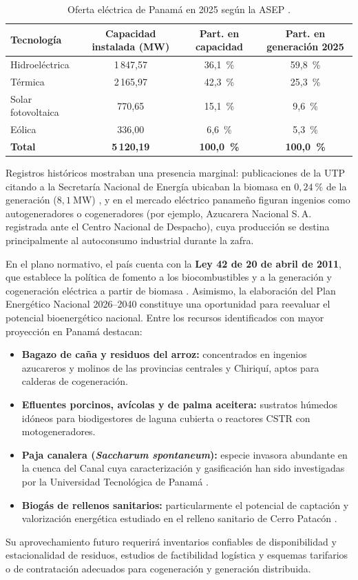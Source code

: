 \begin{table}[htbp]
\centering
\caption{Oferta eléctrica de Panamá en 2025 según la ASEP \cite{asep2025oferta}.}
\label{tab:asep_panama}
\begin{tabular}{@{}lccc@{}}
\toprule
\textbf{Tecnología} & \textbf{Capacidad instalada (MW)} & \textbf{Part. en capacidad} & \textbf{Part. en generación 2025} \\
\midrule
Hidroeléctrica & 1\,847,57 & 36,1~\% & 59,8~\% \\
Térmica & 2\,165,97 & 42,3~\% & 25,3~\% \\
Solar fotovoltaica & 770,65 & 15,1~\% & 9,6~\% \\
Eólica & 336,00 & 6,6~\% & 5,3~\% \\
\midrule
\textbf{Total} & \textbf{5\,120,19} & \textbf{100,0~\%} & \textbf{100,0~\%} \\
\bottomrule
\end{tabular}
\end{table}

Registros históricos mostraban una presencia marginal: publicaciones de la UTP citando a la Secretaría Nacional de Energía ubicaban la biomasa en $0{,}24~\%$ de la generación ($8{,}1~\text{MW}$) \cite{utp_pajacanalera}, y en el mercado eléctrico panameño figuran ingenios como autogeneradores o cogeneradores (por ejemplo, Azucarera Nacional S.\,A. registrada ante el Centro Nacional de Despacho), cuya producción se destina principalmente al autoconsumo industrial durante la zafra.

En el plano normativo, el país cuenta con la \textbf{Ley 42 de 20 de abril de 2011}, que establece la política de fomento a los biocombustibles y a la generación y cogeneración eléctrica a partir de biomasa \cite{panama2011ley42}. Asimismo, la elaboración del Plan Energético Nacional 2026--2040 constituye una oportunidad para reevaluar el potencial bioenergético nacional. Entre los recursos identificados con mayor proyección en Panamá destacan:
\begin{itemize}[leftmargin=1.5em]
\item \textbf{Bagazo de caña y residuos del arroz:} concentrados en ingenios azucareros y molinos de las provincias centrales y Chiriquí, aptos para calderas de cogeneración.
\item \textbf{Efluentes porcinos, avícolas y de palma aceitera:} sustratos húmedos idóneos para biodigestores de laguna cubierta o reactores CSTR con motogeneradores.
\item \textbf{Paja canalera (\textit{Saccharum spontaneum}):} especie invasora abundante en la cuenca del Canal cuya caracterización y gasificación han sido investigadas por la Universidad Tecnológica de Panamá \cite{utp_pajacanalera}.
\item \textbf{Biogás de rellenos sanitarios:} particularmente el potencial de captación y valorización energética estudiado en el relleno sanitario de Cerro Patacón \cite{unachi_cerropatacon}.
\end{itemize}
Su aprovechamiento futuro requerirá inventarios confiables de disponibilidad y estacionalidad de residuos, estudios de factibilidad logística y esquemas tarifarios o de contratación adecuados para cogeneración y generación distribuida.
